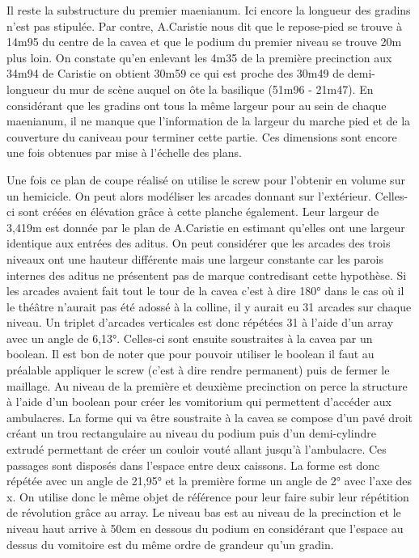 Il reste la substructure du premier maenianum. Ici encore la longueur des gradins n'est pas stipulée. Par contre, A.Caristie nous dit que le repose-pied se trouve à 14m95 du centre de la cavea et que le podium du premier niveau se trouve 20m plus loin. On constate qu'en enlevant les 4m35 de la première precinction aux 34m94 de Caristie on obtient 30m59 ce qui est proche des 30m49 de demi-longueur du mur de scène auquel on ôte la basilique (51m96 - 21m47). En considérant que les gradins ont tous la même largeur pour au sein de chaque maenianum, il ne manque que l'information de la largeur du marche pied et de la couverture du caniveau pour terminer cette partie. Ces dimensions sont encore une fois obtenues par mise à l'échelle des plans.

		
Une fois ce plan de coupe réalisé on utilise le \gls{screw} pour l'obtenir en volume sur un hemicicle. On peut alors modéliser les arcades donnant sur l'extérieur. Celles-ci sont créées en élévation grâce à cette planche également. Leur largeur de 3,419m est donnée par le plan de A.Caristie \cite[Pl. XXXIII]{orangePl} en estimant qu'elles ont une largeur identique aux entrées des \gls{aditus}. On peut considérer que les arcades des trois niveaux ont une hauteur différente mais une largeur constante car les parois internes des \gls{aditus} ne présentent pas de marque contredisant cette hypothèse. Si les arcades avaient fait tout le tour de la cavea c'est à dire 180° dans le cas où il le théâtre n'aurait pas été adossé à la colline, il y aurait eu 31 arcades sur chaque niveau. Un triplet d'arcades verticales est donc répétées 31 à l'aide d'un \gls{array} avec un angle de 6,13°. Celles-ci sont ensuite soustraites à la \gls{cavea} par un \gls{boolean}. Il est bon de noter que pour pouvoir utiliser le \gls{boolean} il faut au préalable appliquer le \gls{screw} (c'est à dire rendre permanent) puis de fermer le maillage. Au niveau de la première et deuxième \gls{precinction} on perce la structure à l'aide d'un \gls{boolean} pour créer les \gls{vomitorium} qui permettent d'accéder aux ambulacres. La forme qui va être soustraite à la cavea se compose d'un pavé droit créant un trou rectangulaire au niveau du podium puis d'un demi-cylindre extrudé permettant de créer un couloir vouté allant jusqu'à l'ambulacre. Ces passages sont disposés dans l'espace entre deux caissons. La forme est donc répétée avec un angle de 21,95° et la première forme un angle de 2° avec l'axe des x. On utilise donc le même objet de référence pour leur faire subir leur répétition de révolution grâce au \gls{array}. Le niveau bas est au niveau de la \gls{precinction} et le niveau haut arrive à 50cm en dessous du podium en considérant que l'espace au dessus du vomitoire est du même ordre de grandeur qu'un gradin. 

